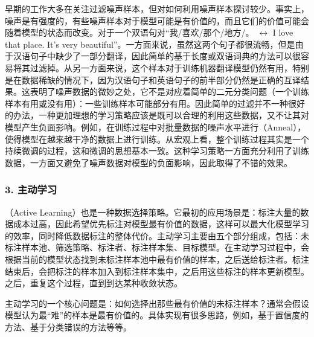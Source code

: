 \parinterval 早期的工作大多在关注过滤噪声样本，但对如何利用噪声样本探讨较少。事实上，噪声是有强度的，有些噪声样本对于模型可能是有价值的，而且它们的价值可能会随着模型的状态而改变。对于一个双语句对“我/喜欢/那个/地方/。 $\leftrightarrow$ I love that place. It's very beautiful”。一方面来说，虽然这两个句子都很流畅，但是由于汉语句子中缺少了一部分翻译，因此简单的基于长度或双语词典的方法可以很容易将其过滤掉。从另一方面来说，这个样本对于训练机器翻译模型仍然有用，特别是在数据稀缺的情况下，因为汉语句子和英语句子的前半部分仍然是正确的互译结果。这表明了噪声数据的微妙之处，它不是对应着简单的二元分类问题（一个训练样本有用或没有用）：一些训练样本可能部分有用。因此简单的过滤并不一种很好的办法，一种更加理想的学习策略应该是既可以合理的利用这些数据，又不让其对模型产生负面影响。例如，在训练过程中对批量数据的噪声水平进行{\small{}}（Anneal），使得模型在越来越干净的数据上进行训练。从宏观上看，整个训练过程其实是一个持续微调的过程，这和微调的思想基本一致。这种学习策略一方面充分利用了训练数据，一方面又避免了噪声数据对模型的负面影响，因此取得了不错的效果。


\subsubsection{3. 主动学习}

（Active Learning）也是一种数据选择策略。它最初的应用场景是：标注大量的数据成本过高，因此希望优先标注对模型最有价值的数据，这样可以最大化模型学习的效率，同时降低数据标注的整体代价。主动学习主要由五个部分组成，包括：未标注样本池、筛选策略、标注者、标注样本集、目标模型。在主动学习过程中，会根据当前的模型状态找到未标注样本池中最有价值的样本，之后送给标注者。标注结束后，会把标注的样本加入到标注样本集中，之后用这些标注的样本更新模型。之后，重复这个过程，直到到达某种收敛状态。

\parinterval 主动学习的一个核心问题是：如何选择出那些最有价值的未标注样本？通常会假设模型认为最“难”的样本是最有价值的。具体实现有很多思路，例如，基于置信度的方法、基于分类错误的方法等等。

